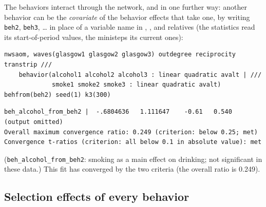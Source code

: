 The behaviors interact through the network, and in one further way: another behavior can be the \emph{covariate} of the behavior effects that take one, by writing \texttt{beh2}, \texttt{beh3}, \dots{} in place of a variable name in , ,  and relatives (the statistics read its start-of-period values, the ministeps its current ones):
\begin{lstlisting}
nwsaom, waves(glasgow1 glasgow2 glasgow3) outdegree reciprocity transtrip ///
    behavior(alcohol1 alcohol2 alcohol3 : linear quadratic avalt | ///
             smoke1 smoke2 smoke3 : linear quadratic avalt) behfrom(beh2) seed(1) k3(300)
\end{lstlisting}
\begin{lstlisting}
beh_alcohol_from_beh2 |  -.6804636   1.111647    -0.61   0.540
(output omitted)
Overall maximum convergence ratio: 0.249 (criterion: below 0.25; met)
Convergence t-ratios (criterion: all below 0.1 in absolute value): met
\end{lstlisting}
(\texttt{beh\_alcohol\_from\_beh2}: smoking as a main effect on drinking; not significant in these data.) This fit has converged by the two criteria (the overall ratio is 0.249).

\subsection{Selection effects of every behavior}\label{sec:multibeh-sel}

